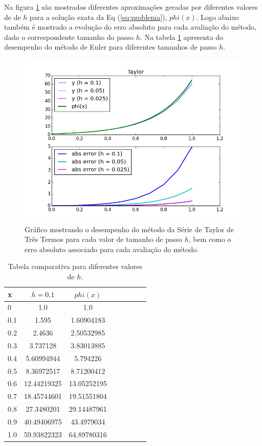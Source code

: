 \documentclass[a4paper]{article}
\begin{document}
Na figura \ref{fig:taylor} são mostrados diferentes aproximações geradas por diferentes valores de de $h$ para a solução exata da Eq (\ref{eq:problema}), $phi(x)$. Logo abaixo também é mostrado a evolução do erro absoluto para cada avaliação do método, dado o correspondente tamanho do passo $h$. Na tabela \ref{tab:taylor} apresenta do desempenho do método de Euler para diferentes tamanhos de passo $h$.

\begin{figure}[!h]
\centering
\includegraphics[width=1.0\textwidth]{plots/Taylor.png}
\caption{\label{fig:taylor}Gráfico mostrando o desempenho do método da Série de Taylor de Três Termos para cada valor de tamanho de passo $h$, bem como o erro absoluto associado para cada avaliação do método.}
\end{figure}

\begin{table}[!h]
\centering
\begin{tabular}{l*{6}{c}r}
x               & $h=0.1$ & $phi(x)$ \\
\hline
0                   & 1.0 & 1.0          \\
0.1                 & 1.595 & 1.60904183   \\
0.2                 & 2.4636 & 2.50532985   \\
0.3                 & 3.737128 & 3.83013885   \\
0.4                 & 5.60994944 & 5.794226     \\
0.5                 & 8.36972517 & 8.71200412   \\
0.6                 & 12.44219325 & 13.05252195  \\
0.7                 & 18.45744601 & 19.51551804  \\
0.8                 & 27.3480201 & 29.14487961  \\
0.9                 & 40.49406975 & 43.4979034   \\
1.0                 & 59.93822323 & 64.89780316  \\
\end{tabular}
\caption{\label{tab:taylor}Tabela comparativa para diferentes valores de $h$.}
\end{table}
\end{document}
